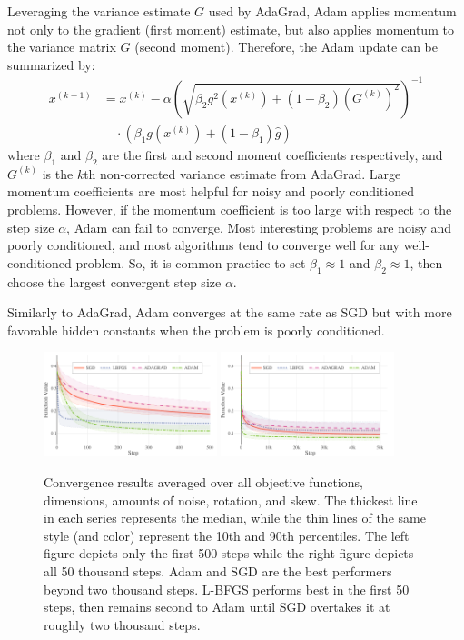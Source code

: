 \documentclass[conference]{ieeeconf}  %
\begin{document}
Leveraging the variance estimate $G$ used by AdaGrad, Adam applies
momentum not only to the gradient (first moment) estimate, but also
applies momentum to the variance matrix $G$ (second moment).
Therefore, the Adam update can be summarized by:
\begin{align*}
  x^{(k+1)} &= x^{(k)} - \alpha \left(\sqrt{\beta_2 g^2(x^{(k)}) + (1-\beta_2)(G^{(k)})^2}\right)^{-1}\\
  &\quad\cdot\left(\beta_1 g(x^{(k)}) + (1-\beta_1)\hat{g}\right)
\end{align*}
where $\beta_1$ and $\beta_2$ are the first and second moment
coefficients respectively, and $G^{(k)}$ is the $k$th non-corrected
variance estimate from AdaGrad.  Large momentum coefficients are most
helpful for noisy and poorly conditioned problems.  However, if the
momentum coefficient is too large with respect to the step size
$\alpha$, Adam can fail to converge.  Most interesting problems are
noisy and poorly conditioned, and most algorithms tend to converge
well for any well-conditioned problem.  So, it is common practice to
set $\beta_1 \approx 1$ and $\beta_2 \approx 1$, then choose the
largest convergent step size $\alpha$.

Similarly to AdaGrad, Adam converges at the same rate as SGD but with
more favorable hidden constants when the problem is poorly
conditioned.

\begin{figure}
  \centering
  \includegraphics[width=0.45\textwidth]{Figures/final-algorithm-500}
  \hspace{5mm}
  \includegraphics[width=0.45\textwidth]{Figures/final-algorithm-50K}
  \caption{Convergence results averaged over all objective functions,
    dimensions, amounts of noise, rotation, and skew. The thickest
    line in each series represents the median, while the thin lines of
    the same style (and color) represent the 10th and 90th
    percentiles. The left figure depicts only the first 500 steps
    while the right figure depicts all 50 thousand steps. Adam and SGD
    are the best performers beyond two thousand steps. L-BFGS
    performs best in the first 50 steps, then remains second to Adam
    until SGD overtakes it at roughly two thousand steps.}
  \label{fig:results-all}
\end{figure}
\end{document}

